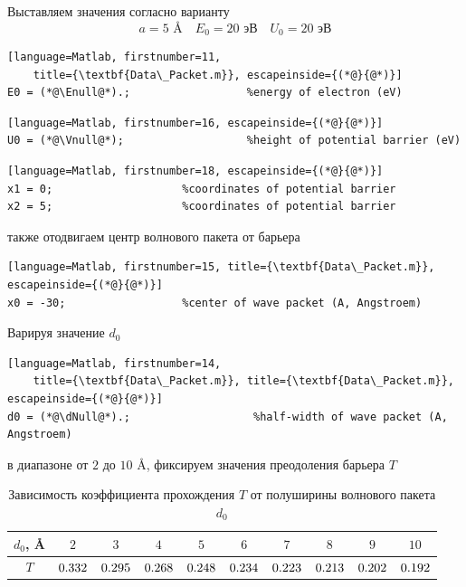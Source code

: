 \documentclass[12pt,a4paper]{article}
\newcommand{\CalcThree}[1]{\fpeval{round((#1),3)}}
\def\Enull{20}
\def\Vnull{20}
\def\TdNullOne  {0.33181} %
\def\TdNullTwo  {0.29537} %
\def\TdNullThree{0.26841} %
\def\TdNullFour {0.24845} %
\def\TdNullFive {0.23385} %
\def\TdNullSix  {0.22251} %
\def\TdNullSeven{0.21252} %
\def\TdNullEight{0.20245} %
\def\TdNullNine {0.19186} %
\begin{document}
Выставляем значения согласно варианту 
\begin{equation*}
	a = 5\text{ \AA} \quad E_0 = \Enull\text{ эВ} \quad U_0 = \Vnull\text{ эВ}
\end{equation*}
\begin{lstlisting}[language=Matlab, firstnumber=11, 
	title={\textbf{Data\_Packet.m}}, escapeinside={(*@}{@*)}]
E0 = (*@\Enull@*).;                  %energy of electron (eV)
\end{lstlisting}
\begin{lstlisting}[language=Matlab, firstnumber=16, escapeinside={(*@}{@*)}]
U0 = (*@\Vnull@*);                   %height of potential barrier (eV)
\end{lstlisting}
\begin{lstlisting}[language=Matlab, firstnumber=18, escapeinside={(*@}{@*)}]
x1 = 0;                    %coordinates of potential barrier
x2 = 5;                    %coordinates of potential barrier
\end{lstlisting}
также отодвигаем центр волнового пакета от барьера
\begin{lstlisting}[language=Matlab, firstnumber=15, title={\textbf{Data\_Packet.m}}, escapeinside={(*@}{@*)}]
x0 = -30;                  %center of wave packet (A, Angstroem)
\end{lstlisting}
Варируя значение $d_0$ 
\begin{lstlisting}[language=Matlab, firstnumber=14, 
	title={\textbf{Data\_Packet.m}}, title={\textbf{Data\_Packet.m}}, escapeinside={(*@}{@*)}]
d0 = (*@\dNull@*).;                   %half-width of wave packet (A, Angstroem)
\end{lstlisting}
в диапазоне от $2$ до $10$ \AA, фиксируем значения преодоления барьера $T$
\begin{table}[H]
	\centering
	\begin{tabularx}{\textwidth}{|C|C|C|C|C|C|C|C|C|C|}
		\hline
		$d_0$, \AA & $2$ & $3$ & $4$ & $5$ & $6$ & $7$ & $8$ & $9$ & $10$  \\
		\hline
		$T$ & $\CalcThree{\TdNullOne}$ & $\CalcThree{\TdNullTwo}$ & $\CalcThree{\TdNullThree}$ 
		    & $\CalcThree{\TdNullFour}$ & $\CalcThree{\TdNullFive}$ & $\CalcThree{\TdNullSix}$ 
			& $\CalcThree{\TdNullSeven}$ & $\CalcThree{\TdNullEight}$ & $\CalcThree{\TdNullNine}$ \\
		\hline
	\end{tabularx}
	\caption{Зависимость коэффициента прохождения $T$ от полуширины волнового пакета $d_0$}
	\label{tab:transmission_d0}
\end{table}
\end{document}
